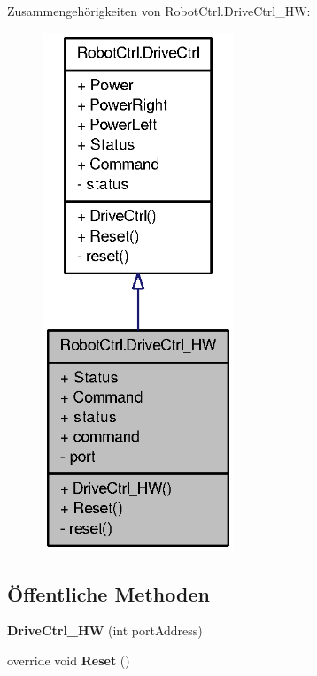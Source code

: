 Zusammengehörigkeiten von RobotCtrl.DriveCtrl\_\-HW:\nopagebreak
\begin{figure}[H]
\begin{center}
\leavevmode
\includegraphics[width=162pt]{class_robot_ctrl_1_1_drive_ctrl___h_w__coll__graph}
\end{center}
\end{figure}
\subsection*{Öffentliche Methoden}
\begin{DoxyCompactItemize}
\item 
\hypertarget{class_robot_ctrl_1_1_drive_ctrl___h_w_a35edb9b280ac1c76f0471ce2204f2235}{
{\bfseries DriveCtrl\_\-HW} (int portAddress)}
\label{class_robot_ctrl_1_1_drive_ctrl___h_w_a35edb9b280ac1c76f0471ce2204f2235}

\item 
\hypertarget{class_robot_ctrl_1_1_drive_ctrl___h_w_a30785a704b5385ea9c41ad87ebb8f61f}{
override void {\bfseries Reset} ()}
\label{class_robot_ctrl_1_1_drive_ctrl___h_w_a30785a704b5385ea9c41ad87ebb8f61f}

\end{DoxyCompactItemize}

